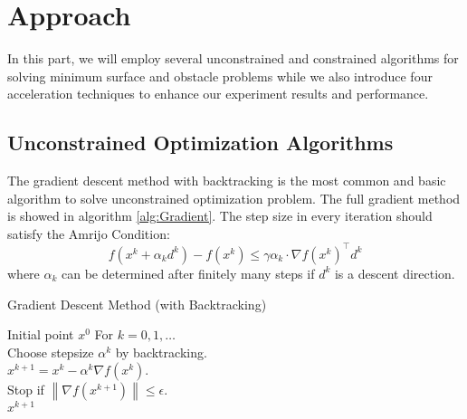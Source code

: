 \section{Approach}
In this part, we will employ several unconstrained and constrained algorithms for solving minimum surface and obstacle problems while we also introduce four acceleration techniques to enhance our experiment results and performance.

\subsection{Unconstrained Optimization Algorithms}
The gradient descent method with backtracking is the most common and basic algorithm to solve unconstrained optimization problem. The full gradient method is showed in algorithm \ref{alg:Gradient}. The step size in every iteration should satisfy the Amrijo Condition:
$$
f\left(x^{k}+\alpha_{k} d^{k}\right)-f\left(x^{k}\right) \leq \gamma \alpha_{k} \cdot \nabla f\left(x^{k}\right)^{\top} d^{k}
$$
where $\alpha_{k}$ can be determined after finitely many steps if $d^{k}$ is a descent direction.
\begin{algorithm}[H]
  \caption{Gradient Descent Method (with Backtracking)}
  \label{alg:Gradient}
  \begin{algorithmic}[1]
  \REQUIRE
  Initial point $x^{0}$
  \STATE For $k=0,1, \ldots$ \\
  \STATE Choose stepsize $\alpha^{k}$ by backtracking. \\
  \STATE $x^{k+1}=x^{k}-\alpha^{k} \nabla f\left(x^{k}\right)$. \\
  \STATE Stop if $\left\|\nabla f\left(x^{k+1}\right)\right\| \leq \epsilon$. \\     
  \ENSURE $x^{k+1}$ 
 \end{algorithmic}
 \end{algorithm} 
 
